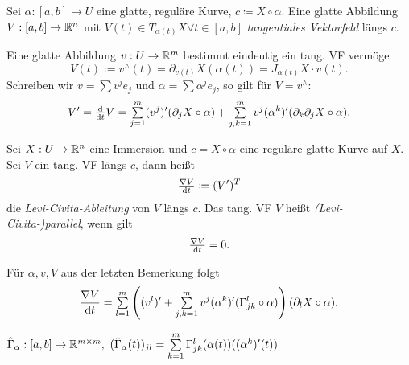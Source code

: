 \documentclass{cheat-sheet}
\begin{document}

\begin{definition}
  Sei $\alpha : [a, b] \to U$ eine glatte, reguläre Kurve, $c \coloneqq X \circ \alpha$. Eine glatte Abbildung $V : [a, b] \to \mathbb{R}^n$ mit $V(t) \in T_{\alpha(t)} X \forall t \in [a, b]$ \emph{tangentiales Vektorfeld} längs $c$.
\end{definition}


\begin{bem}
  Eine glatte Abbildung $v : U \to \mathbb{R}^m$ bestimmt eindeutig ein tang. VF vermöge
  \[ V(t) := v^\wedge(t) = \partial_{v(t)} X(\alpha(t)) = J_{\alpha(t)} X \cdot v(t). \]
  Schreiben wir $v = \sum v^j e_j$ und $\alpha = \sum \alpha^j e_j$, so gilt für $V = v^\wedge$:
  \[ V' = \tfrac{\d}{\d t} V = \sum_{j=1}^m (v^j)' (\partial_j X \circ \alpha) + \sum_{j,k=1}^m v^j (\alpha^k)' (\partial_k \partial_j X \circ \alpha). \]
\end{bem}

\begin{definition}
  Sei $X : U \to \mathbb{R}^n$ eine Immersion und $c = X \circ \alpha$ eine reguläre glatte Kurve auf $X$. Sei $V$ ein tang. VF längs $c$, dann heißt
  \[ \tfrac{\nabla V}{\mathrm{d} t} \coloneqq (V')^T \]
  die \emph{Levi-Civita-Ableitung} von $V$ längs $c$. Das tang. VF $V$ heißt \emph{(Levi-Civita-)parallel}, wenn gilt
  \[ \tfrac{\nabla V}{\mathrm{d} t} = 0. \]
\end{definition}

\begin{bem}
  Für $\alpha, v, V$ aus der letzten Bemerkung folgt
  \[ \frac{\nabla V}{\d t} = \sum_{l=1}^m \left( (v^l)' + \sum_{j,k=1}^m v^j (\alpha^k)' (\Gamma_{jk}^l \circ \alpha) \right) (\partial_l X \circ \alpha). \]
\end{bem}

\begin{nota}
  $\hat{\Gamma}_{\alpha} : [a, b] \to \R^{m \times m}, \,\, (\hat{\Gamma}_{\alpha}(t))_{jl} = \sum_{k=1}^m \Gamma_{jk}^l (\alpha(t))((\alpha^k)'(t))$
\end{nota}
\end{document}
